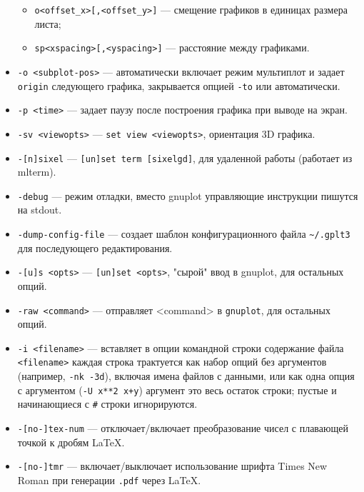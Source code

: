 \documentclass[12pt]{article}
\def\gnuplot{{\tt gnuplot}}
\begin{document}
\begin{itemize}
\begin{itemize}
\item  \verb'o<offset_x>[,<offset_y>]' --- смещение графиков в единицах размера листа;
\item  \verb'sp<xspacing>[,<yspacing>]' --- расстояние между графиками.
\end{itemize}
\item \verb'-o <subplot-pos>' --- автоматически включает режим мультиплот и задает \verb'origin'
   следующего графика, закрывается опцией \verb'-to' или автоматически.
\item \verb'-p <time>' --- задает паузу после построения графика при выводе на экран.
\item \verb'-sv <viewopts>' --- \verb'set view <viewopts>', ориентация 3D графика.
\item \verb'-[n]sixel' --- \verb'[un]set term [sixelgd]', для удаленной работы (работает из mlterm).
\item \verb'-debug' --- режим отладки, вместо gnuplot управляющие инструкции пишутся на stdout.
\item \verb'-dump-config-file' --- создает шаблон конфигурационного файла \verb'~/.gplt3' для последующего редактирования.
\item \verb'-[u]s <opts>' --- \verb'[un]set <opts>', "сырой" ввод в gnuplot, для остальных опций.
\item \verb'-raw <command>' --- отправляет <command> в \gnuplot{}, для остальных опций.
\item \verb'-i <filename>' --- вставляет в опции командной строки содержание файла \verb'<filename>'
   каждая строка трактуется как набор опций без аргументов (например, \verb'-nk -3d'), 
   включая имена файлов с данными, или как одна опция с аргументом (\verb'-U x**2 x+y')
   аргумент это весь остаток строки; пустые и начинающиеся с \verb'#' строки игнорируются.
\item \verb'-[no-]tex-num' --- отключает/включает преобразование чисел с плавающей точкой к дробям \LaTeX.
\item \verb'-[no-]tmr' --- включает/выключает использование шрифта Times New Roman при генерации \verb'.pdf' через \LaTeX.
\end{itemize}
\end{document}
